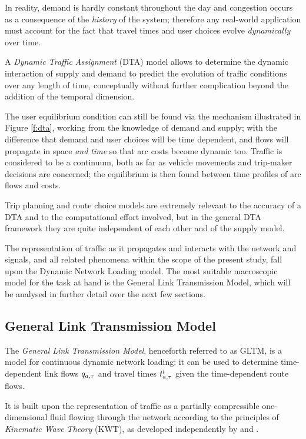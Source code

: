 In reality, demand is hardly constant throughout the day and congestion occurs as a consequence of the \emph{history} of the system; therefore any real-world application must account for the fact that travel times and user choices evolve \emph{dynamically} over time.

A \emph{Dynamic Traffic Assignment} (DTA) model allows to determine the dynamic interaction of supply and demand to predict the evolution of traffic conditions over any length of time, conceptually without further complication beyond the addition of the temporal dimension.

The user equilibrium condition can still be found via the mechanism illustrated in Figure \ref{f:dta}, working from the knowledge of demand and supply; with the difference that demand and user choices will be time dependent, and flows will propagate in space \emph{and time} so that arc costs become dynamic too. Traffic is considered to be a continuum, both as far as vehicle movements and trip-maker decisions are concerned; the equilibrium is then found between time profiles of arc flows and costs.

Trip planning and route choice models are extremely relevant to the accuracy of a DTA and to the computational effort involved, but in the general DTA framework they are quite independent of each other and of the supply model.

The representation of traffic as it propagates and interacts with the network and signals, and all related phenomena within the scope of the present study, fall upon the Dynamic Network Loading model.
The most suitable macroscopic model for the task at hand is the General Link Transmission Model, which will be analysed in further detail over the next few sections.

\subsection{General Link Transmission Model} \label{s:gltm}
The \emph{General Link Transmission Model}, henceforth referred to as GLTM, is a model for continuous dynamic network loading: it can be used to determine time-dependent link flows $q_{a,\tau}$ and travel times $t_{a,\tau}^t$ given the time-dependent route flows.

It is built upon the representation of traffic as a partially compressible one-dimensional fluid flowing through the network according to the principles of \emph{Kinematic Wave Theory} (KWT), as developed independently by \cite{lighthill1955kinematic} and \cite{richards1956shock}.

